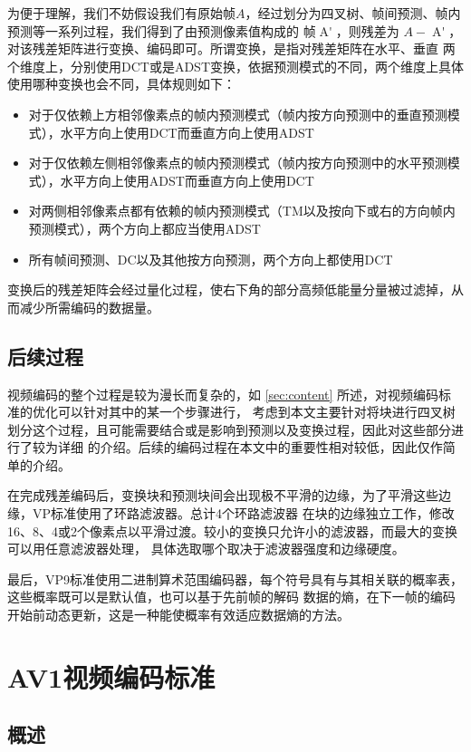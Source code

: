 为便于理解，我们不妨假设我们有原始帧$A$，经过划分为四叉树、帧间预测、帧内预测等一系列过程，我们得到了由预测像素值构成的
帧$\mathop{{A}'}$，则残差为 $A - \mathop{{A}'}$，对该残差矩阵进行变换、编码即可。所谓变换，是指对残差矩阵在水平、垂直
两个维度上，分别使用DCT或是ADST变换，依据预测模式的不同，两个维度上具体使用哪种变换也会不同，具体规则如下：

\begin{itemize}
  \item 对于仅依赖上方相邻像素点的帧内预测模式（帧内按方向预测中的垂直预测模式），水平方向上使用DCT而垂直方向上使用ADST
  \item 对于仅依赖左侧相邻像素点的帧内预测模式（帧内按方向预测中的水平预测模式），水平方向上使用ADST而垂直方向上使用DCT
  \item 对两侧相邻像素点都有依赖的帧内预测模式（TM以及按向下或右的方向帧内预测模式），两个方向上都应当使用ADST
  \item 所有帧间预测、DC以及其他按方向预测，两个方向上都使用DCT
\end{itemize}

变换后的残差矩阵会经过量化过程，使右下角的部分高频低能量分量被过滤掉，从而减少所需编码的数据量。

\subsection{后续过程}

视频编码的整个过程是较为漫长而复杂的，如 \ref{sec:content} 所述，对视频编码标准的优化可以针对其中的某一个步骤进行，
考虑到本文主要针对将块进行四叉树划分这个过程，且可能需要结合或是影响到预测以及变换过程，因此对这些部分进行了较为详细
的介绍。后续的编码过程在本文中的重要性相对较低，因此仅作简单的介绍。

在完成残差编码后，变换块和预测块间会出现极不平滑的边缘，为了平滑这些边缘，VP标准使用了环路滤波器。总计4个环路滤波器
在块的边缘独立工作，修改16、8、4或2个像素点以平滑过渡。较小的变换只允许小的滤波器，而最大的变换可以用任意滤波器处理，
具体选取哪个取决于滤波器强度和边缘硬度。

最后，VP9标准使用二进制算术范围编码器，每个符号具有与其相关联的概率表，这些概率既可以是默认值，也可以基于先前帧的解码
数据的熵，在下一帧的编码开始前动态更新，这是一种能使概率有效适应数据熵的方法。

\section{AV1视频编码标准}

\subsection{概述}

